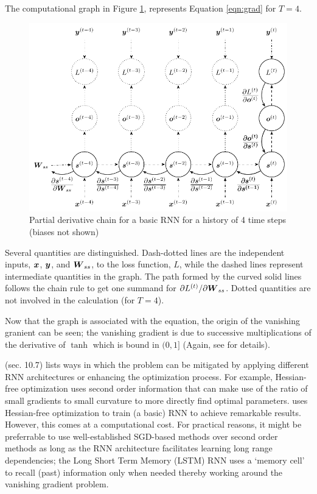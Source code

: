 The computational graph in Figure \ref{fig:grad}, represents Equation \ref{eqn:grad} for $T=4$.
%
\begin{figure}[H]
  \centering
  \includegraphics[]{figs/grad.pdf}
  \caption{Partial derivative chain for a basic RNN for a history of 4 time steps (biases not shown)}
  \label{fig:grad}
\end{figure}
%
\noindent
Several quantities are distinguished. Dash-dotted lines are the independent inputs, $\boldsymbol{x}$, $\boldsymbol{y}$, and $\boldsymbol{W}_{ss}$, to the loss function, $L$, while the dashed lines represent intermediate quantities in the graph.
%
The path formed by the curved solid lines follows the chain rule to get one summand for $\partial{L}\sp{(t)}/\partial{\ensuremath{\boldsymbol{W}}_{ss}}$.
%
Dotted quantities are not involved in the calculation (for $T=4$).


Now that the graph is associated with the equation, the origin of the vanishing granient can be seen;
%
the vanishing gradient is due to successive multiplications of the derivative of $\tanh$ which is bound in $(0,1]$ (Again, see \cite{Hochreiter,Bengio1994,Doya1992,Pascanu2013c} for details).


\cite{Bengio-et-al-2015-Book} (sec. 10.7) lists ways in which the problem can be mitigated by applying different RNN architectures or enhancing the optimization process.
%
For example, Hessian-free optimization \cite{Martens2010} uses second order information that can make use of the ratio of small gradients to small curvature to more directly find optimal parameters.
%
\cite{Martens2011} uses Hessian-free optimization to train (a basic) RNN to achieve remarkable results.
%
However, this comes at a computational cost.
%
For practical reasons, it might be preferrable to use well-established SGD-based methods over second order methods \cite{Bengio2012,Dauphin} as long as the RNN architecture facilitates learning long range dependencies;
%
the Long Short Term Memory (LSTM) RNN \cite{Hochreiter1997} uses a `memory cell' to recall (past) information only when needed thereby working around the vanishing gradient problem.




